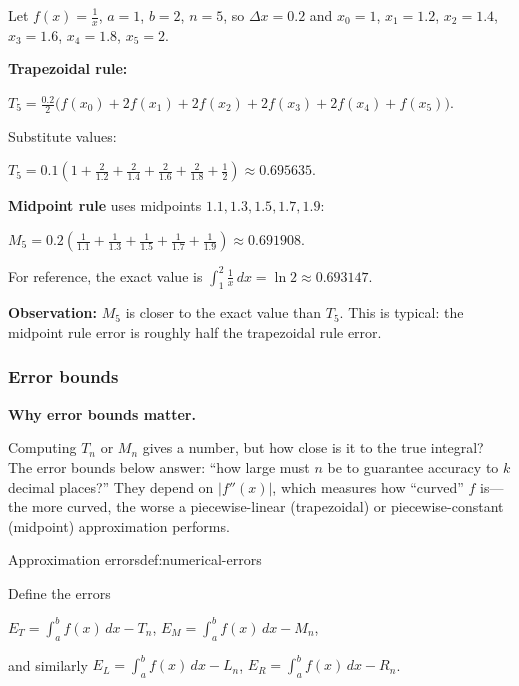 \begin{examplebox}[title={Worked Example: $T_5$ and $M_5$ for $\displaystyle\int_1^2\frac{1}{x}\,dx$}]

Let $f(x)=\frac1x$, $a=1$, $b=2$, $n=5$, so $\Delta x=0.2$ and $x_0=1$, $x_1=1.2$, $x_2=1.4$, $x_3=1.6$, $x_4=1.8$, $x_5=2$.

\textbf{Trapezoidal rule:}

$T_5=\frac{0.2}{2}\big(f(x_0)+2f(x_1)+2f(x_2)+2f(x_3)+2f(x_4)+f(x_5)\big)$.

Substitute values:

$T_5 = 0.1\left(1+\frac{2}{1.2}+\frac{2}{1.4}+\frac{2}{1.6}+\frac{2}{1.8}+\frac12\right)\approx 0.695635$.

\textbf{Midpoint rule} uses midpoints $1.1,1.3,1.5,1.7,1.9$:

$M_5=0.2\left(\frac{1}{1.1}+\frac{1}{1.3}+\frac{1}{1.5}+\frac{1}{1.7}+\frac{1}{1.9}\right)\approx 0.691908$.

For reference, the exact value is $\int_1^2\frac1x\,dx = \ln 2 \approx 0.693147$.

\textbf{Observation:} $M_5$ is closer to the exact value than $T_5$. This is typical: the midpoint rule error is roughly half the trapezoidal rule error.

\end{examplebox}

\subsubsection*{Error bounds}

\textbf{Why error bounds matter.}

Computing $T_n$ or $M_n$ gives a number, but how close is it to the true integral? The error bounds below answer: ``how large must $n$ be to guarantee accuracy to $k$ decimal places?'' They depend on $|f''(x)|$, which measures how ``curved'' $f$ is---the more curved, the worse a piecewise-linear (trapezoidal) or piecewise-constant (midpoint) approximation performs.

\begin{definition}{Approximation errors}{def:numerical-errors}

Define the errors

$E_T=\int_a^b f(x)\,dx - T_n$,\quad
$E_M=\int_a^b f(x)\,dx - M_n$,

and similarly $E_L=\int_a^b f(x)\,dx-L_n$, $E_R=\int_a^b f(x)\,dx-R_n$.

\end{definition}

